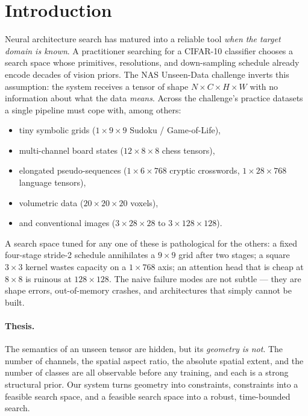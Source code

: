 \documentclass[10pt,twocolumn]{article}
\begin{document}
\section{Introduction}

Neural architecture search has matured into a reliable tool \emph{when the
target domain is known}. A practitioner searching for a CIFAR-10 classifier
chooses a search space whose primitives, resolutions, and down-sampling
schedule already encode decades of vision priors. The NAS Unseen-Data
challenge inverts this assumption: the system receives a tensor of shape
$N\times C\times H\times W$ with no information about what the data
\emph{means}. Across the challenge's practice datasets a single pipeline must
cope with, among others:

\begin{itemize}\itemsep2pt
\item tiny symbolic grids ($1{\times}9{\times}9$ Sudoku / Game-of-Life),
\item multi-channel board states ($12{\times}8{\times}8$ chess tensors),
\item elongated pseudo-sequences ($1{\times}6{\times}768$ cryptic crosswords,
      $1{\times}28{\times}768$ language tensors),
\item volumetric data ($20{\times}20{\times}20$ voxels),
\item and conventional images ($3{\times}28{\times}28$ to $3{\times}128{\times}128$).
\end{itemize}

A search space tuned for any one of these is pathological for the others: a
fixed four-stage stride-2 schedule annihilates a $9{\times}9$ grid after two
stages; a square $3{\times}3$ kernel wastes capacity on a $1{\times}768$ axis;
an attention head that is cheap at $8{\times}8$ is ruinous at
$128{\times}128$. The naive failure modes are not subtle --- they are shape
errors, out-of-memory crashes, and architectures that simply cannot be built.

\paragraph{Thesis.} The semantics of an unseen tensor are hidden, but its
\emph{geometry is not}. The number of channels, the spatial aspect ratio, the
absolute spatial extent, and the number of classes are all observable before
any training, and each is a strong structural prior. Our system turns geometry
into constraints, constraints into a feasible search space, and a feasible
search space into a robust, time-bounded search.
\end{document}
